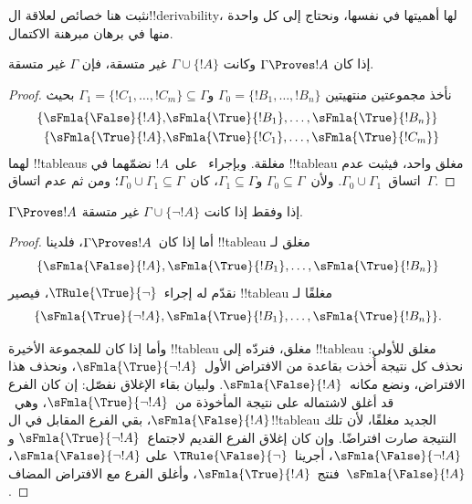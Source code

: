 \documentclass[../../../include/open-logic-section]{subfiles}
\begin{document}
      {}
      {}


نثبت هنا خصائص لعلاقة ال!!{derivability}، لها أهميتها في نفسها،
ونحتاج إلى كل واحدة منها في برهان مبرهنة الاكتمال.


\begin{prop}
  إذا كان $\Gamma \Proves !A$ وكانت $\Gamma \cup \{!A\}$ غير متسقة،
  فإن $\Gamma$ غير متسقة.
\end{prop}

\begin{proof}
نأخذ مجموعتين منتهيتين $\Gamma_0 = \{!B_1, \dots, !B_n\}$ و$\Gamma_1
  =\{!C_1, \dots, !C_m\} \subseteq \Gamma$ بحيث
  \begin{align*}
    \{\sFmla{\False}{!A}, &
    \sFmla{\True}{!B_1}, \dots, \sFmla{\True}{!B_n}\} \\
    \{\sFmla{\True}{!A}, &
    \sFmla{\True}{!C_1}, \dots, \sFmla{\True}{!C_m}\}
  \end{align*}
  لهما !!{tableau}s مغلقة. وبإجراء~\Cut{} على~$!A$ نضمّهما
  في !!{tableau} مغلق واحد، فيثبت عدم اتساق~$\Gamma_0
  \cup \Gamma_1$. ولأن~$\Gamma_0
  \subseteq \Gamma$ و$\Gamma_1 \subseteq \Gamma$، كان~$\Gamma_0 \cup
  \Gamma_1 \subseteq \Gamma$؛ ومن ثم عدم اتساق~$\Gamma$.
\end{proof}

\begin{prop}
$\Gamma \Proves !A$ إذا وفقط إذا كانت $\Gamma \cup \{\lnot !A\}$ غير متسقة.
\end{prop}

\begin{proof}
أما إذا كان~$\Gamma \Proves !A$، فلدينا !!{tableau} مغلق لـ
\[
\{\sFmla{\False}{!A},
\sFmla{\True}{!B_1}, \dots, \sFmla{\True}{!B_n}\}
\]
نقدّم له إجراء~$\TRule{\True}{\lnot}$، فيصير !!{tableau} مغلقًا لـ
\[
\{\sFmla{\True}{\lnot !A},
\sFmla{\True}{!B_1}, \dots, \sFmla{\True}{!B_n}\}.
\]

وأما إذا كان للمجموعة الأخيرة !!{tableau} مغلق، فنردّه إلى
!!{tableau} مغلق للأولى: نحذف كل نتيجة أُخذت بقاعدة
\TRule{\True}{\lnot} من الافتراض الأول~$\sFmla{\True}{\lnot !A}$،
ونحذف هذا الافتراض، ونضع مكانه~$\sFmla{\False}{!A}$.
ولبيان بقاء الإغلاق نفصّل: إن كان الفرع قد أغلق لاشتماله على نتيجة
\TRule{\True}{\lnot} المأخوذة من~$\sFmla{\True}{\lnot !A}$،
وهي~$\sFmla{\False}{!A}$، بقي الفرع المقابل في ال!!{tableau} الجديد
مغلقًا، لأن تلك النتيجة صارت افتراضًا. وإن كان إغلاق الفرع القديم
لاجتماع~$\sFmla{\True}{\lnot !A}$ و$\sFmla{\False}{\lnot
  !A}$، أجرينا~$\TRule{\False}{\lnot}$ على
$\sFmla{\False}{\lnot !A}$، فنتج~$\sFmla{\True}{!A}$،
وأغلق الفرع مع الافتراض المضاف~$\sFmla{\False}{!A}$.
\end{proof}
\end{document}
